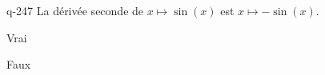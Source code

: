 \begin{truefalse}{q-247}
La dérivée seconde de $x\mapsto \sin(x)$ est $x\mapsto -\sin(x)$.
\item* Vrai
\item Faux
\end{truefalse}

